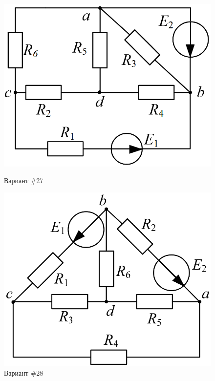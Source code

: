 \begin{figure}[H]
    \centering
    \begin{minipage}{0.48\textwidth}
        \centering
        \includegraphics[width=\textwidth]{images/27_task.png}
        \caption{Вариант \#27}
        \label{fig:task_27}
    \end{minipage}
    \hfill
    \begin{minipage}{0.48\textwidth}
        \centering
        \includegraphics[width=\textwidth]{images/28_task.png}
        \caption{Вариант \#28}
        \label{fig:task_28}
    \end{minipage}
\end{figure}
